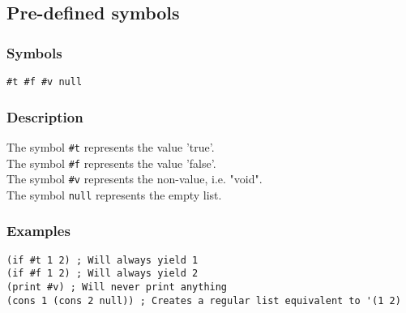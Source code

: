 \subsection{Pre-defined symbols}
\label{builtins/symbols}

\subsubsection*{Symbols}
\begin{lstlisting}
#t #f #v null
\end{lstlisting}

\subsubsection*{Description}
The symbol \lstinline|#t| represents the value 'true'.\\
The symbol \lstinline|#f| represents the value 'false'.\\
The symbol \lstinline|#v| represents the non-value, i.e. "void".\\
The symbol \lstinline|null| represents the empty list.

\subsubsection*{Examples}
\begin{lstlisting}
(if #t 1 2) ; Will always yield 1
(if #f 1 2) ; Will always yield 2
(print #v) ; Will never print anything
(cons 1 (cons 2 null)) ; Creates a regular list equivalent to '(1 2)
\end{lstlisting}
